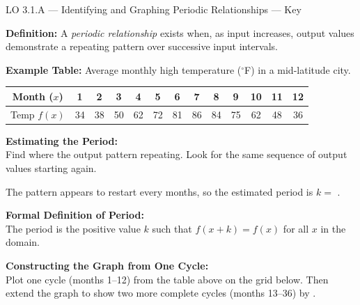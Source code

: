 \documentclass[10pt]{article}
\begin{document}
\begin{notesbox}{LO 3.1.A --- Identifying and Graphing Periodic Relationships --- Key}

\textbf{Definition:} A \emph{periodic relationship} exists when, as input
increases, output values demonstrate a repeating pattern over successive
 input intervals.

\vspace{8pt}
\textbf{Example Table:} Average monthly high temperature (${}^\circ$F) in a
mid-latitude city.

\vspace{4pt}
\begin{center}
\renewcommand{\arraystretch}{1.35}
\begin{tabular}{|c|c|c|c|c|c|c|c|c|c|c|c|c|}
\hline
Month ($x$) & 1 & 2 & 3 & 4 & 5 & 6 & 7 & 8 & 9 & 10 & 11 & 12 \\
\hline
Temp $f(x)$ & 34 & 38 & 50 & 62 & 72 & 81 & 86 & 84 & 75 & 62 & 48 & 36 \\
\hline
\end{tabular}
\end{center}

\vspace{6pt}
\textbf{Estimating the Period:}\\
Find where the output pattern  repeating.
Look for the same sequence of output values starting again.

\vspace{4pt}
The pattern appears to restart every  months,
so the estimated period is $k = $ .

\vspace{8pt}
\textbf{Formal Definition of Period:}\\
The period is the  positive value $k$ such that
$f(x + k) = f(x)$ for all $x$ in the domain.

\vspace{8pt}
\textbf{Constructing the Graph from One Cycle:}\\
Plot one cycle (months 1--12) from the table above on the grid below.
Then extend the graph to show two more complete cycles (months 13--36)
by .


\end{notesbox}
\end{document}
